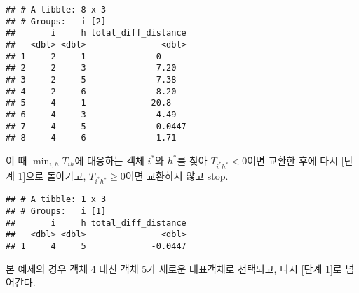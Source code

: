 \documentclass[]{book}
\newenvironment{Shaded}{\begin{snugshade}}{\end{snugshade}}
\newcommand{\DataTypeTok}[1]{\textcolor[rgb]{0.13,0.29,0.53}{#1}}
\newcommand{\DecValTok}[1]{\textcolor[rgb]{0.00,0.00,0.81}{#1}}
\newcommand{\KeywordTok}[1]{\textcolor[rgb]{0.13,0.29,0.53}{\textbf{#1}}}
\newcommand{\NormalTok}[1]{#1}
\newcommand{\OperatorTok}[1]{\textcolor[rgb]{0.81,0.36,0.00}{\textbf{#1}}}
\newcommand{\StringTok}[1]{\textcolor[rgb]{0.31,0.60,0.02}{#1}}
\begin{document}
\begin{Shaded}
\end{Shaded}

\begin{verbatim}
## # A tibble: 8 x 3
## # Groups:   i [2]
##       i     h total_diff_distance
##   <dbl> <dbl>               <dbl>
## 1     2     1              0     
## 2     2     3              7.20  
## 3     2     5              7.38  
## 4     2     6              8.20  
## 5     4     1             20.8   
## 6     4     3              4.49  
## 7     4     5             -0.0447
## 8     4     6              1.71
\end{verbatim}

이 때 \(\min_{i, h} T_{ih}\)에 대응하는 객체 \(i^*\)와 \(h^*\)를 찾아 \(T_{i^*h^*} < 0\)이면 교환한 후에 다시 {[}단계 1{]}으로 돌아가고, \(T_{i^*h^*} \geq 0\)이면 교환하지 않고 stop.

\begin{Shaded}
\end{Shaded}

\begin{verbatim}
## # A tibble: 1 x 3
## # Groups:   i [1]
##       i     h total_diff_distance
##   <dbl> <dbl>               <dbl>
## 1     4     5             -0.0447
\end{verbatim}

본 예제의 경우 객체 4 대신 객체 5가 새로운 대표객체로 선택되고, 다시 {[}단계 1{]}로 넘어간다.

\begin{Shaded}
\end{Shaded}
\end{document}

